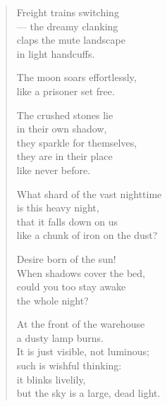 \documentclass[11pt]{book}
\newcommand*{\centeredornament}{\centerline{\pgfornament[width=6cm]{88}}}
\begin{document}
\newpage

\vspace*{-15mm}
\centeredornament





\begin{verse}
  Freight trains switching \\
  --- the dreamy clanking \\
  claps the mute landscape \\
  in light handcuffs.

  The moon soars effortlessly, \\
  like a prisoner set free.

  The crushed stones lie \\
  in their own shadow, \\
  they sparkle for themselves, \\
  they are in their place \\
  like never before.

  What shard of the vast nighttime \\
  is this heavy night, \\
  that it falls down on us \\
  like a chunk of iron on the dust?

  Desire born of the sun! \\
  When shadows cover the bed, \\
  could you too stay awake \\
  the whole night?

  At the front of the warehouse \\
  a dusty lamp burns. \\
  It is just visible, not luminous; \\
  such is wishful thinking: \\
  it blinks livelily, \\
  but the sky is a large, dead light.
\end{verse}

\newpage

\vspace*{-15mm}
\centeredornament

\end{document}
